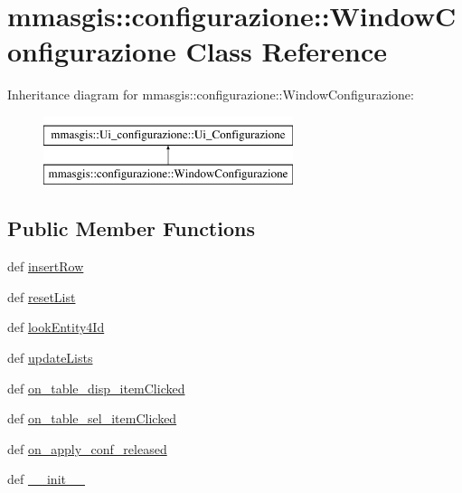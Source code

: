 \hypertarget{classmmasgis_1_1configurazione_1_1WindowConfigurazione}{
\section{mmasgis::configurazione::WindowConfigurazione Class Reference}
\label{classmmasgis_1_1configurazione_1_1WindowConfigurazione}
}
Inheritance diagram for mmasgis::configurazione::WindowConfigurazione:\begin{figure}[H]
\begin{center}
\leavevmode
\includegraphics[height=2.000000cm]{classmmasgis_1_1configurazione_1_1WindowConfigurazione}
\end{center}
\end{figure}
\subsection*{Public Member Functions}
\begin{DoxyCompactItemize}
\item 
def \hyperlink{classmmasgis_1_1configurazione_1_1WindowConfigurazione_af361d8b1a025cb411d2ed6f095333d8e}{insertRow}
\item 
def \hyperlink{classmmasgis_1_1configurazione_1_1WindowConfigurazione_a363b8e7f06d1052e63b5f25f55ecd1bf}{resetList}
\item 
def \hyperlink{classmmasgis_1_1configurazione_1_1WindowConfigurazione_a2d2babcb0139e2a522e4cbc2b29a0649}{lookEntity4Id}
\item 
def \hyperlink{classmmasgis_1_1configurazione_1_1WindowConfigurazione_a3808ee5580984ff6b36083c2b85ef3dd}{updateLists}
\item 
def \hyperlink{classmmasgis_1_1configurazione_1_1WindowConfigurazione_a7e47f6a53003551d8bb801a96579d251}{on\_\-table\_\-disp\_\-itemClicked}
\item 
def \hyperlink{classmmasgis_1_1configurazione_1_1WindowConfigurazione_a54d6bbc3661339ed8cc4c350828c6a5b}{on\_\-table\_\-sel\_\-itemClicked}
\item 
def \hyperlink{classmmasgis_1_1configurazione_1_1WindowConfigurazione_aaef47ffd20b7c68441bbe9d4a827ce51}{on\_\-apply\_\-conf\_\-released}
\item 
def \hyperlink{classmmasgis_1_1configurazione_1_1WindowConfigurazione_ab50db3cb5c54a23834c8f1baad1c4cd1}{\_\-\_\-init\_\-\_\-}
\end{DoxyCompactItemize}
